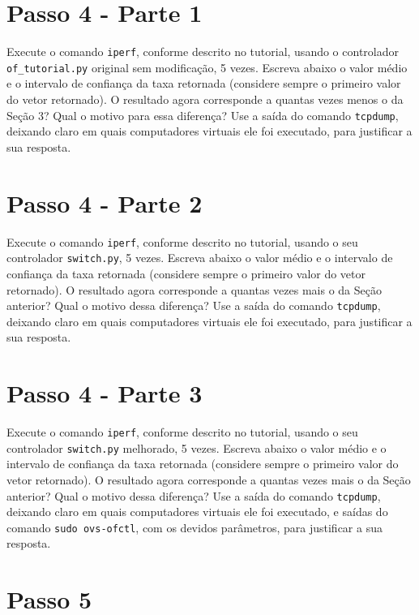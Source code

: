 \documentclass[12pt,letterpaper]{article}
\begin{document}
\section{Passo 4 - Parte 1}


Execute o comando \texttt{iperf}, conforme descrito no tutorial,
usando o controlador \texttt{of\_tutorial.py} original sem
modificação, 5 vezes. Escreva abaixo o valor médio e o intervalo de
confiança da taxa retornada (considere sempre o primeiro valor do
vetor retornado). O resultado agora corresponde a quantas vezes menos
o da Seção 3? Qual o motivo para essa diferença? Use a saída do
comando \texttt{tcpdump}, deixando claro em quais computadores
virtuais ele foi executado, para justificar a sua resposta.


\section{Passo 4 - Parte 2}


Execute o comando \texttt{iperf}, conforme descrito no tutorial,
usando o seu controlador \texttt{switch.py}, 5 vezes.  Escreva abaixo
o valor médio e o intervalo de confiança da taxa retornada (considere
sempre o primeiro valor do vetor retornado). O resultado agora
corresponde a quantas vezes mais o da Seção anterior?  Qual o motivo
dessa diferença? Use a saída do comando \texttt{tcpdump}, deixando
claro em quais computadores virtuais ele foi executado, para
justificar a sua resposta.


\section{Passo 4 - Parte 3}


Execute o comando \texttt{iperf}, conforme descrito no tutorial,
usando o seu controlador \texttt{switch.py} melhorado, 5 vezes.
Escreva abaixo o valor médio e o intervalo de confiança da taxa
retornada (considere sempre o primeiro valor do vetor retornado). O
resultado agora corresponde a quantas vezes mais o da Seção anterior?
Qual o motivo dessa diferença? Use a saída do comando
\texttt{tcpdump}, deixando claro em quais computadores virtuais ele
foi executado, e saídas do comando \texttt{sudo ovs-ofctl}, com os
devidos parâmetros, para justificar a sua resposta.


\section{Passo 5}
\end{document}
